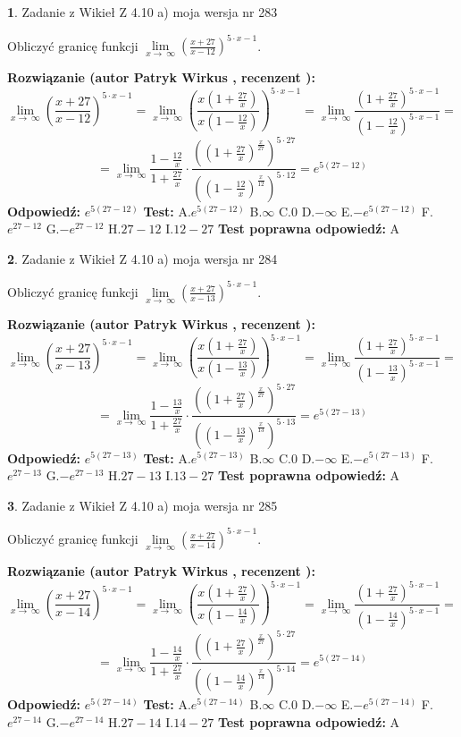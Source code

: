 \documentclass[12pt, a4paper]{article}
\theoremstyle{definition} %
\newtheorem{zad}{}
\newcommand{\zadStart}[1]{\begin{zad}#1\newline}
\newcommand{\zadStop}{\end{zad}}
\newcommand{\rozwStart}[2]{\noindent \textbf{Rozwiązanie (autor #1 , recenzent #2): }\newline}
\newcommand{\rozwStop}{\newline}
\newcommand{\odpStart}{\noindent \textbf{Odpowiedź:}\newline}
\newcommand{\odpStop}{\newline}
\newcommand{\testStart}{\noindent \textbf{Test:}\newline}
\newcommand{\testStop}{\newline}
\newcommand{\kluczStart}{\noindent \textbf{Test poprawna odpowiedź:}\newline}
\newcommand{\kluczStop}{\newline}
\begin{document}
\zadStart{Zadanie z Wikieł Z 4.10 a) moja wersja nr 283}


Obliczyć granicę funkcji  $\lim\limits_{x\to\ \infty}(\frac{x+27}{x-12})^{5\cdot x-1}$.
\zadStop
\rozwStart{Patryk Wirkus}{}
$$\lim\limits_{x\to\ \infty}(\frac{x+27}{x-12})^{5\cdot x-1} = \lim\limits_{x\to\ \infty}(\frac{x(1+\frac{27}{x})}{x(1-\frac{12}{x})})^{5\cdot x-1}=\lim\limits_{x\to\ \infty}\frac{(1+\frac{27}{x})^{5\cdot x-1}}{(1-\frac{12}{x})^{5\cdot x-1}}=$$
$$=\lim\limits_{x\to\ \infty}\frac{1-\frac{12}{x}}{1+\frac{27}{x}}\cdot\frac{((1+\frac{27}{x})^{\frac{x}{27}})^{5\cdot27}}{((1-\frac{12}{x})^{\frac{x}{12}})^{5\cdot12}}=e^{5(27-12)}$$
\rozwStop
\odpStart
$e^{5(27-12)}$
\odpStop
\testStart
A.$e^{5(27-12)}$ B.$\infty$ C.$0$ D.$-\infty$ E.$-e^{5(27-12)}$
F.$e^{27-12}$ G.$-e^{27-12}$
H.$27-12$
I.$12-27$
\testStop
\kluczStart
A
\kluczStop



\zadStart{Zadanie z Wikieł Z 4.10 a) moja wersja nr 284}


Obliczyć granicę funkcji  $\lim\limits_{x\to\ \infty}(\frac{x+27}{x-13})^{5\cdot x-1}$.
\zadStop
\rozwStart{Patryk Wirkus}{}
$$\lim\limits_{x\to\ \infty}(\frac{x+27}{x-13})^{5\cdot x-1} = \lim\limits_{x\to\ \infty}(\frac{x(1+\frac{27}{x})}{x(1-\frac{13}{x})})^{5\cdot x-1}=\lim\limits_{x\to\ \infty}\frac{(1+\frac{27}{x})^{5\cdot x-1}}{(1-\frac{13}{x})^{5\cdot x-1}}=$$
$$=\lim\limits_{x\to\ \infty}\frac{1-\frac{13}{x}}{1+\frac{27}{x}}\cdot\frac{((1+\frac{27}{x})^{\frac{x}{27}})^{5\cdot27}}{((1-\frac{13}{x})^{\frac{x}{13}})^{5\cdot13}}=e^{5(27-13)}$$
\rozwStop
\odpStart
$e^{5(27-13)}$
\odpStop
\testStart
A.$e^{5(27-13)}$ B.$\infty$ C.$0$ D.$-\infty$ E.$-e^{5(27-13)}$
F.$e^{27-13}$ G.$-e^{27-13}$
H.$27-13$
I.$13-27$
\testStop
\kluczStart
A
\kluczStop



\zadStart{Zadanie z Wikieł Z 4.10 a) moja wersja nr 285}


Obliczyć granicę funkcji  $\lim\limits_{x\to\ \infty}(\frac{x+27}{x-14})^{5\cdot x-1}$.
\zadStop
\rozwStart{Patryk Wirkus}{}
$$\lim\limits_{x\to\ \infty}(\frac{x+27}{x-14})^{5\cdot x-1} = \lim\limits_{x\to\ \infty}(\frac{x(1+\frac{27}{x})}{x(1-\frac{14}{x})})^{5\cdot x-1}=\lim\limits_{x\to\ \infty}\frac{(1+\frac{27}{x})^{5\cdot x-1}}{(1-\frac{14}{x})^{5\cdot x-1}}=$$
$$=\lim\limits_{x\to\ \infty}\frac{1-\frac{14}{x}}{1+\frac{27}{x}}\cdot\frac{((1+\frac{27}{x})^{\frac{x}{27}})^{5\cdot27}}{((1-\frac{14}{x})^{\frac{x}{14}})^{5\cdot14}}=e^{5(27-14)}$$
\rozwStop
\odpStart
$e^{5(27-14)}$
\odpStop
\testStart
A.$e^{5(27-14)}$ B.$\infty$ C.$0$ D.$-\infty$ E.$-e^{5(27-14)}$
F.$e^{27-14}$ G.$-e^{27-14}$
H.$27-14$
I.$14-27$
\testStop
\kluczStart
A
\kluczStop
\end{document}
